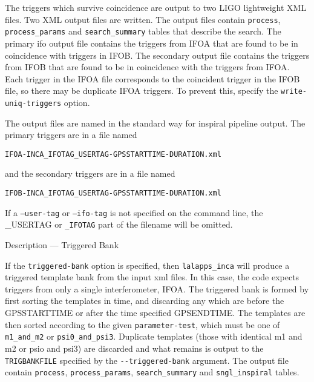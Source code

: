 \begin{entry}
The triggers which survive coincidence are output to two LIGO
lightweight XML files.  Two XML output files are written.  The output
files contain \texttt{process}, \texttt{process\_params} and
\texttt{search\_summary} tables that describe the search. The primary
ifo output file contains the triggers from \textsc{IFOA} that are found
to be in coincidence with triggers in \textsc{IFOB}. The secondary
output file contains the triggers from \textsc{IFOB} that are found to
be in coincidence with the triggers from \textsc{IFOA}.  Each trigger in
the \textsc{IFOA} file corresponds to the coincident trigger in the
\textsc{IFOB} file, so there may be duplicate \textsc{IFOA} triggers.
To prevent this, specify the \texttt{write-uniq-triggers} option.

The output files are named in the standard way for inspiral pipeline output.
The primary triggers are in a file named\\
\begin{center}
\texttt{IFOA-INCA\_IFOTAG\_USERTAG-GPSSTARTTIME-DURATION.xml}\\
\end{center}
and the secondary triggers are in a file named\\
\begin{center}
\texttt{IFOB-INCA\_IFOTAG\_USERTAG-GPSSTARTTIME-DURATION.xml}\\
\end{center}

If a \texttt{--user-tag} or \texttt{--ifo-tag} is not specified on the
command line, the \textsc{\_USERTAG} or \texttt{\_IFOTAG} part of the
filename will be omitted.


\item[Description --- Triggered Bank] 
  
If the \texttt{triggered-bank} option is specified, then
\texttt{lalapps\_inca} will produce a triggered template bank from the
input xml files.  In this case, the code expects triggers from only a
single interferometer, {IFOA}.  The triggered bank is formed by first
sorting the templates in time, and discarding any which are before the
\textsc{GPSSTARTTIME} or after the time specified \textsc{GPSENDTIME}.
The templates are then sorted according to the given
\texttt{parameter-test}, which must be one of \texttt{m1\_and\_m2} or
\texttt{psi0\_and\_psi3}.  Duplicate templates (those with identical m1
    and m2 or psio and psi3) are discarded and what
remains is output to the \texttt{TRIGBANKFILE} specified by the
\verb$--triggered-bank$ argument.  The output file contain
\texttt{process}, \texttt{process\_params}, \texttt{search\_summary} and
\texttt{sngl\_inspiral} tables.  


\end{entry}
